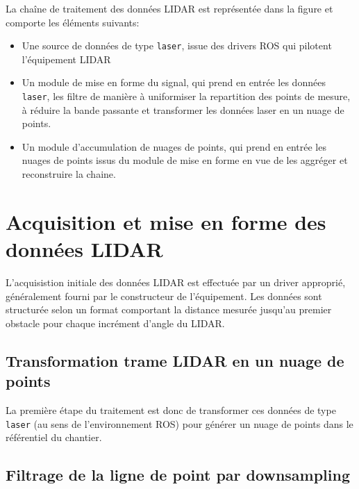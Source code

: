 \documentclass[12pt,a4paper]{report}
\begin{document}
	La chaîne de traitement des données LIDAR est représentée dans la figure  et comporte les éléments suivants:
	\begin{itemize}
		\item Une source de données de type \verb|laser|, issue des drivers ROS qui pilotent l'équipement LIDAR
		
		\item Un module de mise en forme du signal, qui prend en entrée les données \verb|laser|, les filtre de manière à uniformiser la repartition des points de mesure, à réduire la bande passante et transformer les données laser en un nuage de points.
		
		\item Un module d'accumulation de nuages de points, qui prend en entrée les nuages de points issus du module de mise en forme en vue de les aggréger et reconstruire la chaine.
	\end{itemize}
	
	
	\section{Acquisition et mise en forme des données LIDAR}
	L'acquisistion initiale des données LIDAR est effectuée par un driver approprié, généralement fourni par le constructeur de l'équipement. Les données sont structurée selon un format comportant la distance mesurée jusqu'au premier obstacle pour chaque incrément d'angle du LIDAR.

	
		\subsection{Transformation trame LIDAR en un nuage de points}
	
		\para La première étape du traitement est donc de transformer ces données de type \verb|laser| (au sens de l'environnement ROS) pour générer un nuage de points dans le référentiel du chantier.
	
	
		\subsection{Filtrage de la ligne de point par downsampling}
	
\end{document}
